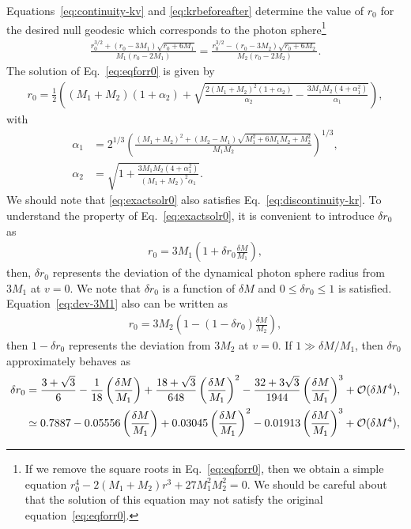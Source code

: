 \documentclass[prd,showpacs,preprintnumbers,groupedaddress,superscriptaddress,nofootinbib,11pt]{revtex4-1} %
\theoremstyle{newplain}
\begin{document}
Equations~\eqref{eq:continuity-kv} and \eqref{eq:krbeforeafter}
determine the value of $r_0$ for the desired null geodesic which corresponds to the photon sphere\footnote{
If we remove the square roots in Eq.~\eqref{eq:eqforr0},
then we obtain a simple equation $r_0^4 - 2(M_1+M_2)r^3 + 27 M_1^2M_2^2=0$.
We should be careful about that the solution of this equation
may not satisfy the original equation~\eqref{eq:eqforr0}.
}
\begin{align}
    \frac{r_0^{3/2}+(r_0-3 M_1)\sqrt{r_0+6 M_1}}{M_1(r_0-2 M_1)}
=
\frac{r_0^{3/2}-(r_0-3 M_2)\sqrt{r_0+6 M_2}}{M_2(r_0-2 M_2)}.
\label{eq:eqforr0}
\end{align}
The solution of Eq.~\eqref{eq:eqforr0} is given by
\begin{align}
r_0 = \frac{1}{2}\left(
(M_1 + M_2)(1 + \alpha_2) + \sqrt{
\frac{2(M_1+M_2)^2(1+\alpha_2)}{\alpha_2} - \frac{3 M_1 M_2 (4+\alpha_1^2)}{\alpha_1}
}
\right),
\label{eq:exactsolr0}
\end{align}
with
\begin{align}
\alpha_1 &=2^{1/3} \left(
\frac{
(M_1+M_2)^2 + (M_2-M_1)\sqrt{M_1^2 + 6 M_1 M_2 + M_2^2}
}{M_1 M_2}
\right)^{1/3},
\\
\alpha_2 &= \sqrt{1 + \frac{3 M_1 M_2(4+\alpha_1^2)}{(M_1 + M_2)^2\alpha_1}}.
\end{align}
We should note that \eqref{eq:exactsolr0} also satisfies Eq.~\eqref{eq:discontinuity-kr}.
To understand the property of Eq.~\eqref{eq:exactsolr0}, it is convenient to introduce
$\delta r_0$ as
\begin{align}
\label{eq:dev-3M1}
    r_0  = 3M_1 \left(1 + \delta r_0 \frac{\delta M}{M_1}\right),
\end{align}
then, $\delta r_0$ represents the deviation of the dynamical photon sphere radius from $3M_1$ at $v=0$.
We note that $\delta r_0$ is a function of $\delta M$ and 
$0 \le \delta r_0 \le 1$ is satisfied.
Equation~\eqref{eq:dev-3M1} also can be written 
as
\begin{align}
\label{eq:dev-3M2}
    r_0=3M_2\left(1-(1-\delta r_0)\frac{\delta M}{M_2}\right),
\end{align}
then $1-\delta r_0$ represents the deviation from $3M_2$ at $v=0$.
If $1 \gg \delta M/M_1$, then $\delta r_0$ approximately behaves as
\begin{align}
\label{eq:delta-r0}
\delta r_0 &=  
\frac{3+\sqrt{3}}{6}
- \frac{1}{18} \left(\frac{\delta M}{M_1}\right)
+ \frac{18+\sqrt{3}}{648} \left(\frac{\delta M}{M_1}\right)^2
- \frac{32+3\sqrt{3}}{1944} \left(\frac{\delta M}{M_1}\right)^3
+{\cal O}(\delta M^4),
\notag\\&\simeq
0.7887
 - 0.05556 \left(\frac{\delta M}{M_1}\right)
+ 0.03045  \left(\frac{\delta M}{M_1}\right)^2
 - 0.01913 \left(\frac{\delta M}{M_1}\right)^3
+{\cal O}(\delta M^4),
\end{align}
\end{document}
